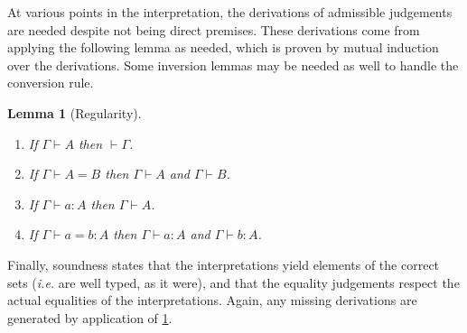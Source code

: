 \documentclass{article}
\makeatletter
\newcommand{\ie}{\textit{i.e.}\@\xspace}
\renewcommand{\_}{\textrm{\textscale{.5}{\textunderscore}}}
\DeclarePairedDelimiter{\ctxt}{\langle}{\rangle}
\DeclarePairedDelimiter{\set}{\{}{\}}
\DeclarePairedDelimiter{\interp}{\llbracket}{\rrbracket}
\newcommand{\id}{\mathrm{id}}
\newcommand{\Empty}{\mathrm{Empty}}
\newcommand{\Absurd}{\mathrm{absurd}}
\newcommand{\pitype}{\mathrm{Pi}}
\newcommand{\lam}{\mathrm{lam}}
\newcommand{\app}{\mathrm{app}}
\newcommand{\univ}{\mathrm{Univ}}
\newcommand{\El}{\mathrm{el}}
\newcommand{\Set}{\mathsf{Set}}
\newcommand{\var}[1]{\mathsf{v}_{#1}}
\newcommand{\absurd}[2]{\mathsf{absurd}_{#1}\,#2}
\newcommand{\el}[1]{\mathsf{el}\,#1}
\newcommand{\code}[1]{#1^{\complement}}
\theoremstyle{definition}
\theoremstyle{plain}
\newtheorem{lemma}[definition]{Lemma}
\makeatother
\begin{document}
\iffalse
\begin{align*}
\interp{\bullet} &= \bullet_{\mathcal{C}} \\
\interp{\Gamma, A} &= \interp{\Gamma} \rhd \interp{A}_{\Gamma} \\
\interp{\var{i}}_\Gamma &= \pi_{\Gamma, i} \\
\interp{\bot}_\Gamma &= \Empty\set{\interp{\Gamma}} \\
\interp{\absurd{A}{a}}_{\Gamma; A} &= \Absurd(\interp{A}_{\Gamma}, \interp{a}_{\Gamma, \bot}) \\
\interp{\Pi A.B}_{\Gamma} &= \pitype(\interp{A}_\Gamma, \interp{B}_{\Gamma, A}) \\
\interp{\lambda A.b}_{\Gamma; \Pi A.B} &= \lam(\interp{b}_{\Gamma, A; B}) \\
\interp{b\,a}_{\Gamma; ?} &= \app(\interp{b}_{\Gamma; \Pi A.B})[\ctxt{\id_{\interp{\Gamma}}, \interp{a}_{\Gamma; A}}] \\
\interp{\Set}_{\Gamma} &= \univ\set{\interp{\Gamma}} \\
\interp{\el{A}}_{\Gamma} &= \El(\interp{A}_{\Gamma; \Set}) \\
\interp{\widehat{\bot}}_{\Gamma; \Set} &= \code(\interp{\bot}_{\Gamma}) \\
\interp{\widehat{\Pi} A.B}_{\Gamma; \Set} &= \code(\interp{\Pi (\el{A}).(\el{B})}_{\Gamma})
\end{align*}
\fi

At various points in the interpretation,
the derivations of admissible judgements are needed despite not being direct premises.
These derivations come from applying the following lemma as needed,
which is proven by mutual induction over the derivations.
Some inversion lemmas may be needed as well to handle the conversion rule.

\begin{lemma}[Regularity] \label{lem:regularity} \hfill
\begin{enumerate}
    \item If $\Gamma \vdash A$ then $\vdash \Gamma$.
    \item If $\Gamma \vdash A = B$ then $\Gamma \vdash A$ and $\Gamma \vdash B$.
    \item If $\Gamma \vdash a : A$ then $\Gamma \vdash A$.
    \item If $\Gamma \vdash a = b : A$ then $\Gamma \vdash a : A$ and $\Gamma \vdash b : A$.
\end{enumerate}
\end{lemma}

Finally, soundness states that the interpretations yield elements of the correct sets
(\ie are well typed, as it were),
and that the equality judgements respect the actual equalities of the interpretations.
Again, any missing derivations are generated by application of \cref{lem:regularity}.
\end{document}
